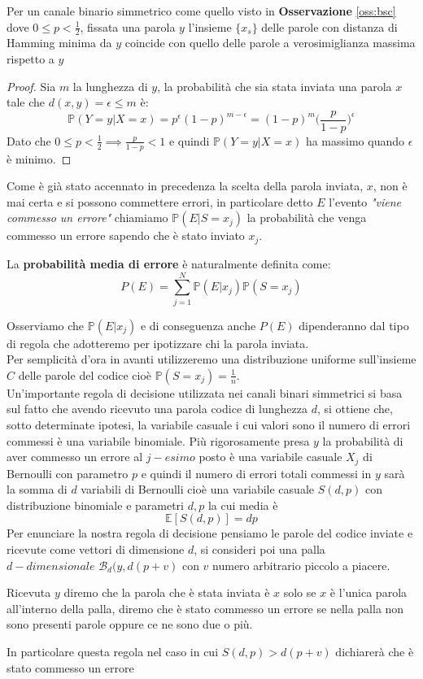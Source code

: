 \begin{teo}
Per un canale binario simmetrico come quello visto in \textbf{Osservazione} \ref{oss:bsc} dove $0 \leq p < \frac{1}{2}$, fissata una parola $y$ l'insieme $\{ x_s \}$ delle parole con distanza di Hamming minima da $y$ coincide con quello delle parole a verosimiglianza massima rispetto a $y$
\end{teo}
\begin{proof}
Sia $m$ la lunghezza di $y$, la probabilità che sia stata inviata una parola $x$ tale che $d(x,y)=\epsilon \leq m$ è:
$$\mathbb{P}(Y=y|X=x)= p^{\epsilon}(1-p)^{m-\epsilon}=(1-p)^m \bigg( \frac{p}{1-p} \bigg)^{\epsilon}$$
Dato che $0 \leq p < \frac{1}{2} \implies \frac{p}{1-p}<1 $ e quindi $\mathbb{P}(Y=y|X=x)$ ha massimo quando $\epsilon$ è minimo.
\end{proof}
Come è già stato accennato in precedenza la scelta della parola inviata, $x$, non è mai certa e si possono commettere errori, in particolare detto $E$ l'evento \textit{"viene commesso un errore"} chiamiamo $\mathbb{P}(E|S=x_j)$ la probabilità che venga commesso un errore sapendo che è stato inviato $x_j$.
\begin{defi}
La \textbf{probabilità media di errore} è naturalmente definita come:
$$P(E)=\sum_{j=1}^{N}\mathbb{P}(E|x_j)\mathbb{P}(S=x_j)$$
\end{defi}
Osserviamo che $\mathbb{P}(E|x_j)$ e di conseguenza anche $P(E)$ dipenderanno dal tipo di regola che adotteremo per ipotizzare chi la parola inviata.\\
Per semplicità d'ora in avanti utilizzeremo una distribuzione uniforme sull'insieme $C$ delle parole del codice cioè $\mathbb{P}(S=x_j)=\frac{1}{n}$.\\
Un'importante regola di decisione utilizzata nei canali binari simmetrici si basa sul fatto che avendo ricevuto una parola codice di lunghezza $d$, si ottiene che, sotto determinate ipotesi, la variabile casuale i cui valori sono il numero di errori commessi è una variabile binomiale. Più rigorosamente presa $y$ la probabilità di aver commesso un errore al $j-esimo$ posto è una variabile casuale $X_j$ di Bernoulli con parametro $p$ e quindi il numero di errori totali commessi in $y$ sarà la somma di $d$ variabili di Bernoulli cioè una variabile casuale $S(d,p)$ con distribuzione binomiale e parametri $d,p$ la cui media è
$$\mathbb{E}[S(d,p)]=dp$$
Per enunciare la nostra regola di decisione pensiamo le parole del codice inviate e ricevute come vettori di dimensione $d$, si consideri poi una palla $d-dimensionale$ $\mathcal{B}_d(y,d(p+v)$ con $v$ numero arbitrario piccolo a piacere. 
\begin{defi} \label{defi:decisione}
Ricevuta $y$ diremo che la parola che è stata inviata è $x$ solo se $x$ è l'unica parola all'interno della palla, diremo che è stato commesso un errore se nella palla non sono presenti parole oppure ce ne sono due o più.
\end{defi}
In particolare questa regola nel caso in cui $S(d,p)>d(p+v)$ dichiarerà che è stato commesso un errore


